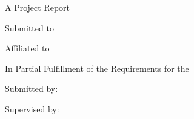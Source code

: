 
\thispagestyle{empty}

\begin{center}

\vspace*{0.5cm}

{\Large\bfseries \projecttitle}

\vspace{1cm}

{\large A Project Report}

\vspace{0.5cm}

{\large Submitted to}

\vspace{0.5cm}

{\large \departmentname}

\vspace{0.5cm}

{\large \collegename}

\vspace{0.5cm}

{\large Affiliated to \universityname}

\vspace{1cm}

{\large In Partial Fulfillment of the Requirements for the}

\vspace{0.5cm}

{\large \degreename}

\vspace{1.5cm}

{\large Submitted by:}

\vspace{0.5cm}

{\large \textbf{\studentname}}

\vspace{0.3cm}

{\large \studentid}

\vspace{1.5cm}

{\large Supervised by:}

\vspace{0.5cm}

{\large \supervisorname}

\vspace{0.3cm}

{\large \supervisortitle}

\vspace{1.5cm}

{\large \submissiondate}

\end{center}
